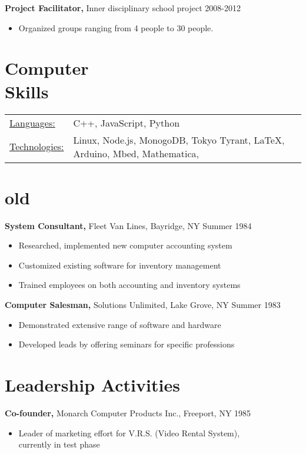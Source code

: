 \documentclass[margin]{res}
\begin{document}
\begin{resume}
{\bf Project Facilitator,} Inner disciplinary school project \hfill 2008-2012
\begin{itemize} \itemsep -2pt
  \item Organized groups ranging from 4 people to 30 people.
\end{itemize}


\section{Computer \\ Skills}
   \begin{tabular}{l p{3in}}
    \underline{Languages:} & C++, JavaScript, Python \\

     \underline{Technologies:} & Linux, Node.js, MonogoDB, Tokyo Tyrant, \LaTeX, Arduino, Mbed, Mathematica,
 \end{tabular}

\section{old}
{\bf System Consultant,} Fleet Van Lines, Bayridge, NY \hfill  Summer 1984
\begin{itemize} \itemsep -2pt %
\item Researched, implemented new computer accounting
  system
\item Customized existing software for inventory
                 management
\item Trained employees on both accounting and inventory
                 systems
\end{itemize}

{\bf Computer Salesman,} Solutions Unlimited, Lake Grove, NY \hfill
Summer 1983
                \begin{itemize} \itemsep -2pt
                 \item  Demonstrated extensive range of software and
                 hardware

                 \item Developed leads by offering seminars for specific
                 professions

		 \end{itemize}

\section{Leadership   Activities}
               {\bf Co-founder,} Monarch Computer Products Inc., Freeport, NY    \hfill         1985
                \begin{itemize} \itemsep -2pt
              \item Leader of marketing effort for V.R.S. (Video
                 Rental System), \\
                  currently in test phase


\end{itemize}
\end{resume}
\end{document}
